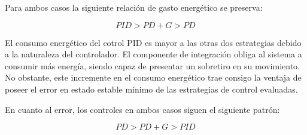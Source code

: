 Para ambos casos la siguiente relación de gasto energético se preserva:

\begin{equation}
    PID > PD + G > PD
\end{equation}

El consumo energético del cotrol PID es mayor a las otras dos estrategias debido a la naturaleza del controlador.
El componente de integración obliga al sistema a consumir más energía, siendo capaz de presentar un sobretiro en su movimiento.
No obstante, este incremente en el consumo energético trae consigo la ventaja de poseer el error en estado estable mínimo de las estrategias de control evaluadas.


En cuanto al error, los controles en ambos casos siguen el siguiente patrón:

\begin{equation}
    PD > PD + G > PID
\end{equation}
